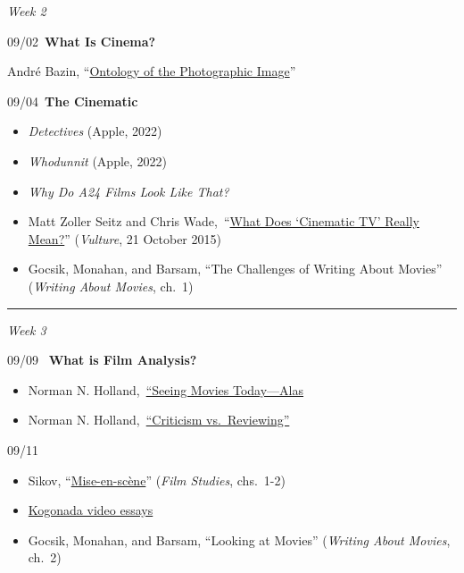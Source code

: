 \documentclass[
  letterpaper,
  DIV=11,
  numbers=noendperiod,
  oneside]{scrartcl}
\providecommand{\tightlist}{%
  \setlength{\itemsep}{0pt}\setlength{\parskip}{0pt}}
\begin{document}
\emph{Week 2}

09/02~\textbf{What Is Cinema?}


André Bazin, ``\href{pdf/bazin-ontology.pdf}{Ontology of the
Photographic Image}''

09/04~\textbf{The Cinematic}

\begin{itemize}
\item
  \emph{Detectives} (Apple, 2022)
\item
  \emph{Whodunnit} (Apple, 2022)
\item
  \emph{Why Do A24 Films Look Like That?}
\item
  Matt Zoller Seitz and Chris
  Wade,~``\href{https://www.vulture.com/2015/10/cinematic-tv-what-does-it-really-mean.html}{What
  Does `Cinematic TV' Really Mean?}'' (\emph{Vulture}, 21 October 2015)
\item
  Gocsik, Monahan, and Barsam, ``The Challenges of Writing About
  Movies'' (\emph{Writing About Movies}, ch.~1)
\end{itemize}

\begin{center}\rule{0.5\linewidth}{0.5pt}\end{center}

\emph{Week 3}

09/09 ~\textbf{What is Film Analysis?}

\begin{itemize}
\tightlist
\item
  Norman N.
  Holland,~\href{https://www.asharperfocus.com/Seeing-Movies-Now.html}{``Seeing
  Movies Today---Alas}\\
\item
  Norman N.
  Holland,~\href{https://www.asharperfocus.com/criticism.html}{``Criticism
  vs.~Reviewing''}
\end{itemize}

09/11

\begin{itemize}
\item
  Sikov, ``\href{pdf/sikov-mise-en-scene-1-2.pdf}{Mise-en-scène}''
  (\emph{Film Studies}, chs.~1-2)
\item
  \href{https://kogonada.com/archive}{Kogonada video essays}
\item
  Gocsik, Monahan, and Barsam, ``Looking at Movies'' (\emph{Writing
  About Movies}, ch.~2)
\end{itemize}
\end{document}
